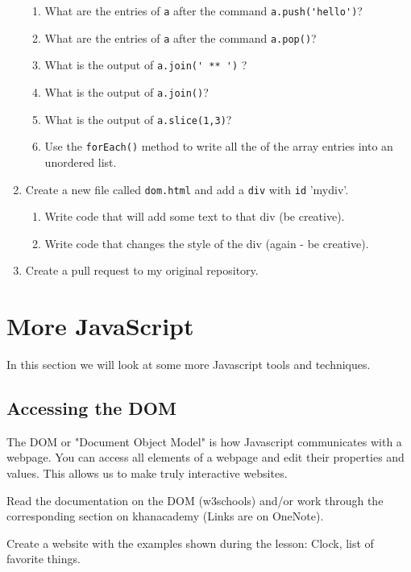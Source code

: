 \documentclass[11pt,a4paper]{report}
\begin{document}
\begin{ex}
\begin{enumerate}
\begin{enumerate}
\item What are the entries of \verb|a| after the command \verb|a.push('hello')|?
\item What are the entries of \verb|a| after the command \verb|a.pop()|?
\item What is the output of \verb|a.join(' ** ')| ?
\item What is the output of \verb|a.join()|?
\item What is the output of \verb|a.slice(1,3)|?
\item Use the \verb|forEach()| method to write all the of the array entries into an unordered list.
\end{enumerate}
\item Create a new file called \verb|dom.html| and add a \verb|div| with \verb|id| 'mydiv'.
\begin{enumerate}
\item Write code that will add some text to that div (be creative).
\item Write code that changes the style of the div (again - be creative).
\end{enumerate}
\item Create a pull request to my original repository.
\end{enumerate}
\end{ex}

\newpage


\section{More JavaScript}
In this section we will look at some more Javascript tools and techniques.

\subsection{Accessing the DOM}

The DOM or "Document Object Model" is how Javascript communicates with a webpage.  You can access all elements of a webpage and edit their properties and values. This allows us to make truly interactive websites.

\begin{ex}
Read the documentation on the DOM (w3schools) and/or work through the corresponding section on khanacademy (Links are on OneNote).
\end{ex}

\begin{ex}
Create a website with the examples shown during the lesson: Clock, list of favorite things.
\end{ex}
\end{document}
